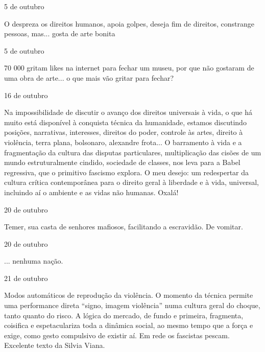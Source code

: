 \begin{flushright}
5 de outubro
\end{flushright}

O  despreza os direitos humanos, apoia golpes, deseja fim de
direitos, constrange pessoas, mas... gosta de arte bonita

\begin{flushright}
5 de outubro
\end{flushright}

70 000 gritam likes na internet para fechar um museu, por que não
gostaram de uma obra de arte... o que mais vão gritar para fechar?

\begin{flushright}
16 de outubro
\end{flushright}

Na impossibilidade de discutir o avanço dos direitos universais à vida,
o que há muito está disponível à conquista técnica da humanidade,
estamos discutindo posições, narrativas, interesses, direitos do poder,
controle às artes, direito à violência, terra plana, bolsonaro,
alexandre frota... O barramento à vida e a fragmentação da cultura das
disputas particulares, multiplicação das cisões de um mundo
estruturalmente cindido, sociedade de classes, nos leva para a Babel
regressiva, que o primitivo fascismo explora. O meu desejo: um
redespertar da cultura crítica contemporânea para o direito geral à
liberdade e à vida, universal, incluindo aí o ambiente e as vidas não
humanas. Oxalá!

\begin{flushright}
20 de outubro
\end{flushright}

Temer, sua casta de senhores mafiosos, facilitando a escravidão. De
vomitar.

\begin{flushright}
20 de outubro
\end{flushright}

... nenhuma nação.

\begin{flushright}
21 de outubro
\end{flushright}

Modos automáticos de reprodução da violência. O momento da técnica
permite uma performance direta ``signo, imagem violência'' numa cultura
geral do choque, tanto quanto do risco. A lógica do mercado, de fundo e
primeira, fragmenta, coisifica e espetaculariza toda a dinâmica social,
ao mesmo tempo que a força e exige, como gesto compulsivo de existir aí.
Em rede os fascistas pescam. Excelente texto da Silvia Viana.

